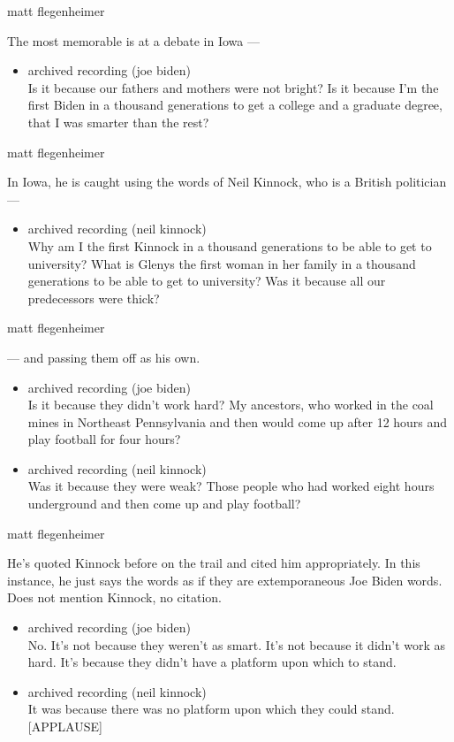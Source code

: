 matt flegenheimer

The most memorable is at a debate in Iowa ---

\begin{itemize}
\tightlist
\item
  archived recording (joe biden)\\
  Is it because our fathers and mothers were not bright? Is it because
  I'm the first Biden in a thousand generations to get a college and a
  graduate degree, that I was smarter than the rest?
\end{itemize}

matt flegenheimer

In Iowa, he is caught using the words of Neil Kinnock, who is a British
politician ---

\begin{itemize}
\tightlist
\item
  archived recording (neil kinnock)\\
  Why am I the first Kinnock in a thousand generations to be able to get
  to university? What is Glenys the first woman in her family in a
  thousand generations to be able to get to university? Was it because
  all our predecessors were thick?
\end{itemize}

matt flegenheimer

--- and passing them off as his own.

\begin{itemize}
\item
  archived recording (joe biden)\\
  Is it because they didn't work hard? My ancestors, who worked in the
  coal mines in Northeast Pennsylvania and then would come up after 12
  hours and play football for four hours?
\item
  archived recording (neil kinnock)\\
  Was it because they were weak? Those people who had worked eight hours
  underground and then come up and play football?
\end{itemize}

matt flegenheimer

He's quoted Kinnock before on the trail and cited him appropriately. In
this instance, he just says the words as if they are extemporaneous Joe
Biden words. Does not mention Kinnock, no citation.

\begin{itemize}
\item
  archived recording (joe biden)\\
  No. It's not because they weren't as smart. It's not because it didn't
  work as hard. It's because they didn't have a platform upon which to
  stand.
\item
  archived recording (neil kinnock)\\
  It was because there was no platform upon which they could stand.
  {[}APPLAUSE{]}
\end{itemize}

